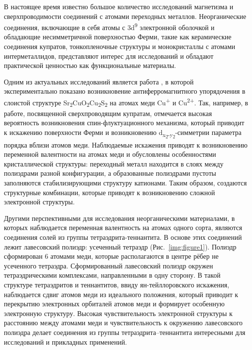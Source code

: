 {\actuality} В настоящее время известно большое количество исследований магнетизма и сверхпроводимости соединений с атомами переходных металлов\cite{Slocombe_2015}.
Неорганические соединения, включающие в себя атомы с 3d\textsuperscript{9} электронной оболочкой и обладающие несимметричной поверхностью Ферми, такие как  керамические соединения купратов, тонкопленочные структуры  и монокристаллы с атомами интерметаллидов, представляют интерес для исследований и обладают практической ценностью как функциональные материалы.

Одним из актуальных исследований является работа \cite{Blandy_2018}, в которой экспериментально показано возникновение антиферромагнитного упорядочения в слоистой структуре Sr\textsubscript{2}CuO\textsubscript{2}Cu\textsubscript{2}S\textsubscript{2} на атомах меди Cu\textsuperscript{+} и Cu\textsuperscript{2+}.
Так, например, в работе, посвященной сверхпроводящим купратам\cite{Comin_2015}, отмечается высокая вероятность возникновения спин-флуктуационного механизма, который приводит к искажению поверхности Ферми и возникновению d\textsubscript{x\textsubscript{2}-y\textsubscript{2}}-симметрии параметра порядка вблизи атомов меди.
Наблюдаемые искажения приводят к возникновению переменной валентности на атомах меди и обусловлены особенностями кристаллической структуры: переходный металл находится в слоях между полиэдрами разной конфигурации, а образованные полиэдрами пустоты заполняются стабилизирующими структуру катионами.
Таким образом, создаются структурные комбинации, которые приводят к возникновению сложной электронной структуры.


Другими перспективными для исследования неорганическими материалами, в которых наблюдается переменная валентность на атомах одного сорта, являются соединения солей из группы тетраэдрита-теннантита.
В основе этих соединений лежит лавесовский полиэдр: усеченный тетраэдр (Рис.~\ref{img:figure1}).
Полиэдр сформирован 6 атомами меди, которые располагаются  в центре рёбер не усеченного тетраэдра.
Сформированный лавесовский полиэдр окружен тетраэдрическими комплексами, направленными в одну сторону.
  В такой структуре тетраэдритов и теннантитов, ввиду ян-тейллоровского искажения,   наблюдается сдвиг атомов меди из идеального положения, который приводит к  перекрытию электронных орбиталей атомов меди и формирует особенную электронную структуру.
Высокая чувствительность электронной структуры к расстоянию между атомами меди и чувствительность к окружению лавесовского полиэдра  делает соединения из группы тетраэдрита--теннантита  интересными для исследований и прикладных применений.

